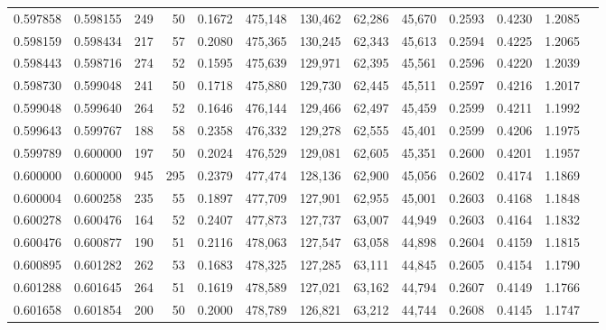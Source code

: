 \begin{tabular}{rrrrrrrrrrrrr}
0.597858 & 0.598155 &    249 &    50 &                                     0.1672 & 475,148 & 130,462 &  62,286 &  45,670 & 0.2593 & 0.4230 & 1.2085 \\
0.598159 & 0.598434 &    217 &    57 &                                     0.2080 & 475,365 & 130,245 &  62,343 &  45,613 & 0.2594 & 0.4225 & 1.2065 \\
0.598443 & 0.598716 &    274 &    52 &                                     0.1595 & 475,639 & 129,971 &  62,395 &  45,561 & 0.2596 & 0.4220 & 1.2039 \\
0.598730 & 0.599048 &    241 &    50 &                                     0.1718 & 475,880 & 129,730 &  62,445 &  45,511 & 0.2597 & 0.4216 & 1.2017 \\
0.599048 & 0.599640 &    264 &    52 &                                     0.1646 & 476,144 & 129,466 &  62,497 &  45,459 & 0.2599 & 0.4211 & 1.1992 \\
0.599643 & 0.599767 &    188 &    58 &                                     0.2358 & 476,332 & 129,278 &  62,555 &  45,401 & 0.2599 & 0.4206 & 1.1975 \\
0.599789 & 0.600000 &    197 &    50 &                                     0.2024 & 476,529 & 129,081 &  62,605 &  45,351 & 0.2600 & 0.4201 & 1.1957 \\
0.600000 & 0.600000 &    945 &   295 &                                     0.2379 & 477,474 & 128,136 &  62,900 &  45,056 & 0.2602 & 0.4174 & 1.1869 \\
0.600004 & 0.600258 &    235 &    55 &                                     0.1897 & 477,709 & 127,901 &  62,955 &  45,001 & 0.2603 & 0.4168 & 1.1848 \\
0.600278 & 0.600476 &    164 &    52 &                                     0.2407 & 477,873 & 127,737 &  63,007 &  44,949 & 0.2603 & 0.4164 & 1.1832 \\
0.600476 & 0.600877 &    190 &    51 &                                     0.2116 & 478,063 & 127,547 &  63,058 &  44,898 & 0.2604 & 0.4159 & 1.1815 \\
0.600895 & 0.601282 &    262 &    53 &                                     0.1683 & 478,325 & 127,285 &  63,111 &  44,845 & 0.2605 & 0.4154 & 1.1790 \\
0.601288 & 0.601645 &    264 &    51 &                                     0.1619 & 478,589 & 127,021 &  63,162 &  44,794 & 0.2607 & 0.4149 & 1.1766 \\
0.601658 & 0.601854 &    200 &    50 &                                     0.2000 & 478,789 & 126,821 &  63,212 &  44,744 & 0.2608 & 0.4145 & 1.1747 \\

\end{tabular}
